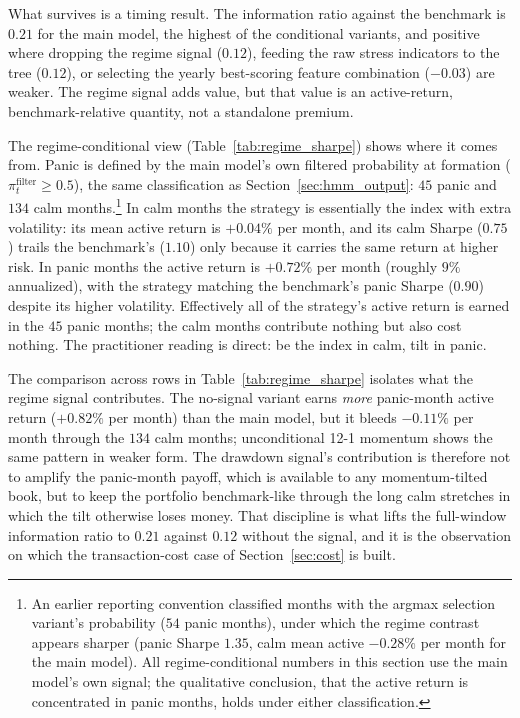 What survives is a timing result. The information ratio against the benchmark is $0.21$ for the main model, the highest of the conditional variants, and positive where dropping the regime signal ($0.12$), feeding the raw stress indicators to the tree ($0.12$), or selecting the yearly best-scoring feature combination ($-0.03$) are weaker. The regime signal adds value, but that value is an active-return, benchmark-relative quantity, not a standalone premium.

The regime-conditional view (Table~\ref{tab:regime_sharpe}) shows where it comes from. Panic is defined by the main model's own filtered probability at formation ($\pi_t^{\text{filter}} \geq 0.5$), the same classification as Section~\ref{sec:hmm_output}: $45$ panic and $134$ calm months.\footnote{An earlier reporting convention classified months with the argmax selection variant's probability ($54$ panic months), under which the regime contrast appears sharper (panic Sharpe $1.35$, calm mean active $-0.28\%$ per month for the main model). All regime-conditional numbers in this section use the main model's own signal; the qualitative conclusion, that the active return is concentrated in panic months, holds under either classification.} In calm months the strategy is essentially the index with extra volatility: its mean active return is $+0.04\%$ per month, and its calm Sharpe ($0.75$) trails the benchmark's ($1.10$) only because it carries the same return at higher risk. In panic months the active return is $+0.72\%$ per month (roughly $9\%$ annualized), with the strategy matching the benchmark's panic Sharpe ($0.90$) despite its higher volatility. Effectively all of the strategy's active return is earned in the $45$ panic months; the calm months contribute nothing but also cost nothing. The practitioner reading is direct: be the index in calm, tilt in panic.

The comparison across rows in Table~\ref{tab:regime_sharpe} isolates what the regime signal contributes. The no-signal variant earns \emph{more} panic-month active return ($+0.82\%$ per month) than the main model, but it bleeds $-0.11\%$ per month through the $134$ calm months; unconditional 12-1 momentum shows the same pattern in weaker form. The drawdown signal's contribution is therefore not to amplify the panic-month payoff, which is available to any momentum-tilted book, but to keep the portfolio benchmark-like through the long calm stretches in which the tilt otherwise loses money. That discipline is what lifts the full-window information ratio to $0.21$ against $0.12$ without the signal, and it is the observation on which the transaction-cost case of Section~\ref{sec:cost} is built.

